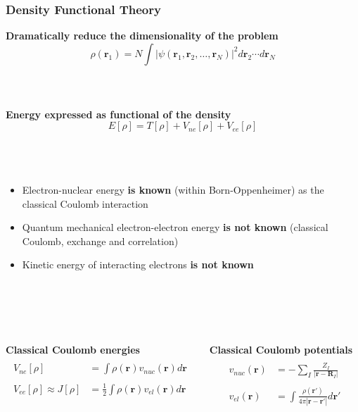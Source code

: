 \documentclass[mathserif, 8pt]{beamer}
\begin{document}
\begin{frame}
    \frametitle{Density Functional Theory}
    \centering
    \textbf{Dramatically reduce the dimensionality of the problem}
    \begin{equation}
	\nonumber
	\rho(\boldsymbol{r}_1) = N \int |\psi(\boldsymbol{r}_1, \boldsymbol{r}_2,\dots,
	\boldsymbol{r}_N)|^2 d\boldsymbol{r}_2\cdots d\boldsymbol{r}_N
    \end{equation}
    \ \\
    \ \\
    \ \\
    \textbf{Energy expressed as functional of the density}
    \begin{equation}
	\nonumber
	E[\rho] = T[\rho] + V_{ne}[\rho] + V_{ee}[\rho]
    \end{equation}
    \ \\
    \ \\
    \ \\
    \begin{itemize}
	\item	Electron-nuclear energy \textbf{is known} (within Born-Oppenheimer) as the classical Coulomb interaction
	\item	Quantum mechanical electron-electron energy \textbf{is not known} (classical Coulomb, exchange and correlation)
	\item	Kinetic energy of interacting electrons \textbf{is not known}
    \end{itemize}
    \ \\
    \ \\
    \ \\
    \begin{columns}
    \begin{column}{.50\textwidth}
    \centering
    \textbf{Classical Coulomb energies}
    \begin{align}
	\nonumber
	&\\
	\nonumber
	V_{ne}[\rho] &= \int \rho(\boldsymbol{r})v_{nuc}(\boldsymbol{r})d\boldsymbol{r}\\
	\nonumber
	&\\
	\nonumber
	V_{ee}[\rho] \approx J[\rho] &= \frac{1}{2} \int \rho(\boldsymbol{r})v_{el}(\boldsymbol{r})d\boldsymbol{r}
    \end{align}
    \end{column}
    \begin{column}{.50\textwidth}
    \centering
    \textbf{Classical Coulomb potentials}
    \begin{align}
	\nonumber
	&\\
	\nonumber
	v_{nuc}(\boldsymbol{r}) &= -\sum_I\frac{Z_I}{|\boldsymbol{r}-\boldsymbol{R}_I|}\\
	\nonumber
	&\\
	\nonumber
	v_{el}(\boldsymbol{r}) &= \int \frac{\rho(\boldsymbol{r}')}{4\pi|\boldsymbol{r}-\boldsymbol{r}'|} d\boldsymbol{r}'
    \end{align}
    \end{column}
    \end{columns}    
\end{frame}
\end{document}
